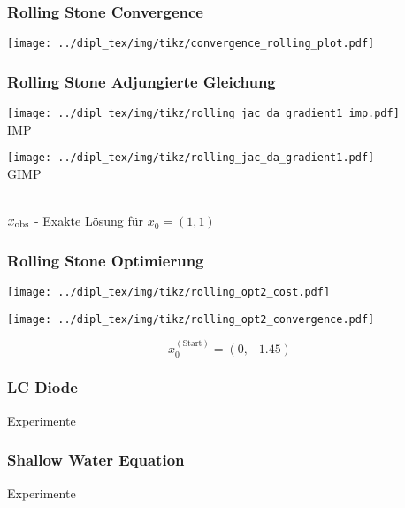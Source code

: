 \begin{frame}[<+->]
\frametitle{Rolling Stone Convergence}
\centering
\texttt{[image: ../dipl\_tex/img/tikz/convergence\_rolling\_plot.pdf]} \\
\end{frame}
\begin{frame}[<+->]
\frametitle{Rolling Stone Adjungierte Gleichung}
\begin{minipage}[c]{0.49\textwidth}
\centering
\texttt{[image: ../dipl\_tex/img/tikz/rolling\_jac\_da\_gradient1\_imp.pdf]} \\ 
IMP
\end{minipage}
\hfill
\begin{minipage}[c]{0.49\textwidth}
\centering
\texttt{[image: ../dipl\_tex/img/tikz/rolling\_jac\_da\_gradient1.pdf]} \\ 
GIMP
\end{minipage}
\centering
\\[0.6cm]
$x_\text{obs}$ - Exakte Lösung für $x_0=(1,1)$

\end{frame}

\begin{frame}[<+->]
\frametitle{Rolling Stone Optimierung}
\begin{minipage}[c]{0.49\textwidth}
\centering
\texttt{[image: ../dipl\_tex/img/tikz/rolling\_opt2\_cost.pdf]} \\ 
\end{minipage}
\hfill
\begin{minipage}[c]{0.49\textwidth}
\centering
\texttt{[image: ../dipl\_tex/img/tikz/rolling\_opt2\_convergence.pdf]} \\ 
\end{minipage}
\[
x_0^{(\text{Start})}=(0,-1.45) 
\]

\end{frame}


\begin{frame}[<+->]
\frametitle{LC Diode}
    
    Experimente

\end{frame}

\begin{frame}[<+->]
\frametitle{Shallow Water Equation}
    
    Experimente

\end{frame}
